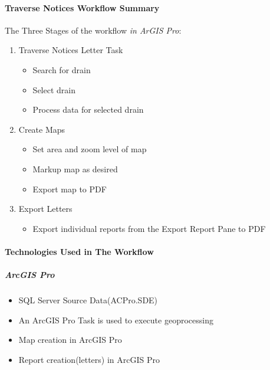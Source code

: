 \paragraph{Traverse Notices Workflow Summary}
\vspace{.25in}

The {\LARGE Three Stages} of the workflow \textit{in ArGIS Pro}:

\begin{enumerate}
\item Traverse Notices Letter Task
\begin{itemize}

\item Search for drain
\item Select drain
\item Process data for selected drain

\end{itemize}

\item Create Maps 
\begin{itemize}
\item Set area and zoom level of map
\item Markup map as desired
\item Export map to PDF
\end{itemize}
\item Export Letters
\begin{itemize} %
\item Export individual reports from the Export Report Pane to PDF
\end{itemize} %
\end{enumerate}
\clearpage
  
\paragraph{Technologies Used in The Workflow}
\subparagraph{ArcGIS Pro}
\begin{itemize}
\item SQL Server Source Data(ACPro.SDE)

\item An ArcGIS Pro Task is used to execute geoprocessing 

\item Map creation in ArcGIS Pro

\item Report creation(letters) in ArcGIS Pro

\end{itemize}
   
